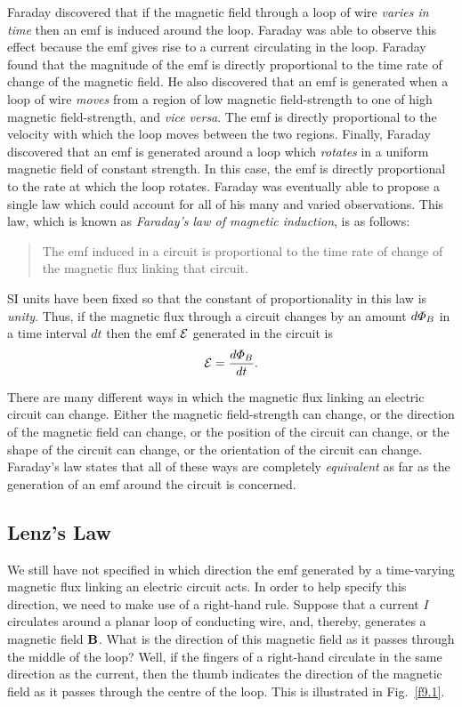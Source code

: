 Faraday discovered  that if the magnetic field through a loop of wire
{\em varies  in time} then an emf is induced around the loop. 
Faraday was able to observe this effect because the emf gives rise to
a current circulating in  the loop. Faraday found that the magnitude of
the emf is directly proportional to the time rate of change of the magnetic field.
He also discovered that an emf is generated when a loop of wire {\em moves}\/
from a region of low magnetic field-strength to one of high magnetic field-strength, and {\em vice versa}. The emf is directly proportional to
the velocity with which the loop  moves between the two regions. Finally,
Faraday discovered that an emf is generated around a loop which  {\em rotates}\/
in a uniform magnetic field of constant strength. In this case, the emf
is directly proportional to the rate at which the loop rotates.
Faraday was eventually
able to propose a single
law which could account for all of his many and varied observations. This law, which is known as
{\em Faraday's law of magnetic induction}, is as follows:
\begin{quote}
{\sf The emf induced in a circuit is proportional to the time rate of change of the
magnetic flux linking that circuit.}
\end{quote} 
SI units have been fixed so that the constant of proportionality in this
law is {\em unity}. Thus, if the magnetic flux through a circuit changes
by an amount $d{\mit\Phi}_B$ in a time interval $dt$
then the emf ${\cal E}$ generated in the circuit is
\begin{equation}
{\cal E} = \frac{d{\mit\Phi}_B}{dt}.
\end{equation}

There are many different ways in which the magnetic flux linking an
electric  circuit can
change. Either the magnetic field-strength can change, or the direction of the magnetic
field can change, or the position of the circuit can change, or the shape of the
circuit can change, or the orientation of the circuit can change. 
Faraday's law states that all of these ways are 
completely {\em equivalent}\/ as far as the generation of an emf around the
circuit is concerned. 

\subsection{Lenz's Law}
We still have not specified in which direction the emf generated 
by a time-varying magnetic flux linking an electric circuit acts. In order to
help specify this direction, we need to make use of a 
 right-hand rule. Suppose
that a current $I$  circulates around a planar loop of conducting wire, and,
thereby, generates a magnetic field ${\bf B}$. What is the direction of
this magnetic field as it passes through the middle of the loop? Well,
if the fingers of a right-hand circulate in the same direction as the current,
then the thumb indicates the direction of the
magnetic field as it passes through the centre of the loop. This is illustrated in 
Fig.~\ref{f9.1}.

